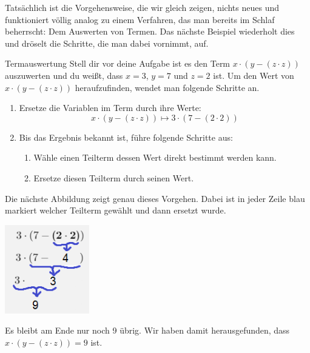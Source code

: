 \documentclass[../../main.tex]{subfiles}
\begin{document}
Tatsächlich ist die Vorgehensweise, die wir gleich zeigen, nichts neues und funktioniert völlig analog zu einem Verfahren, das man bereits im Schlaf beherrscht: 
Dem Auswerten von Termen. Das nächste Beispiel wiederholt dies und dröselt die Schritte, die man dabei vornimmt, auf.

\begin{example}{Termauswertung}
Stell dir vor deine Aufgabe ist es den Term $x \cdot (y - (z \cdot z))$ auszuwerten und du weißt, dass $x = 3$, $y = 7$ und  $z = 2$ ist.
Um den Wert von $x \cdot (y - (z \cdot z))$ heraufzufinden, wendet man folgende Schritte an.
\begin{enumerate}
    \item Ersetze die Variablen im Term durch ihre Werte:
    \[x \cdot (y - (z \cdot z)) \longmapsto 3 \cdot (7 - (2 \cdot 2)) \]
    \item Bis das Ergebnis bekannt ist, führe folgende Schritte aus:
        \begin{enumerate}
            \item Wähle einen Teilterm dessen Wert direkt bestimmt werden kann.
            \item Ersetze diesen Teilterm durch seinen Wert.
        \end{enumerate}
    \end{enumerate}
    
    Die nächste Abbildung zeigt genau dieses Vorgehen. Dabei ist in jeder Zeile blau markiert welcher Teilterm gewählt und dann ersetzt wurde.
    \begin{center}
        \includegraphics[width=0.275\textwidth]{images/TEMP_termalg.png}
    \end{center}

    Es bleibt am Ende nur noch 9 übrig. Wir haben damit herausgefunden, dass $x \cdot (y - (z \cdot z)) = 9$ ist.

\end{example}
\end{document}
